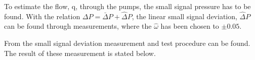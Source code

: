 To estimate the flow, q, through the pumps, the small signal pressure has to be found. With the relation $\Delta P = \bar{\Delta} P + \hat{\Delta} P$, the linear small signal deviation, $\hat{\Delta} P$ can be found through measurements, where the $\hat{\omega}$ has been chosen to $\pm 0.05$.  

From  the small signal deviation measurement and test procedure can be found. The result of these measurement is stated below.










